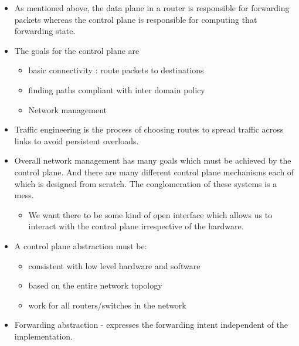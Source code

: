 \begin{itemize}
\tightlist
\item
  As mentioned above, the data plane in a router is responsible for
  forwarding packets whereas the control plane is responsible for
  computing that forwarding state.
\item
  The goals for the control plane are

  \begin{itemize}
  \tightlist
  \item
    basic connectivity : route packets to destinations
  \item
    finding paths compliant with inter domain policy
  \item
    Network management
  \end{itemize}
\item
  Traffic engineering is the process of choosing routes to spread
  traffic across links to avoid persistent overloads.
\item
  Overall network management has many goals which must be achieved by
  the control plane. And there are many different control plane
  mechanisms each of which is designed from scratch. The conglomeration
  of these systems is a mess.

  \begin{itemize}
  \tightlist
  \item
    We want there to be some kind of open interface which allows us to
    interact with the control plane irrespective of the hardware.
  \end{itemize}
\item
  A control plane abstraction must be:

  \begin{itemize}
  \tightlist
  \item
    consistent with low level hardware and software
  \item
    based on the entire network topology
  \item
    work for all routers/switches in the network
  \end{itemize}
\item
  Forwarding abstraction - expresses the forwarding intent independent
  of the implementation.


\end{itemize}
